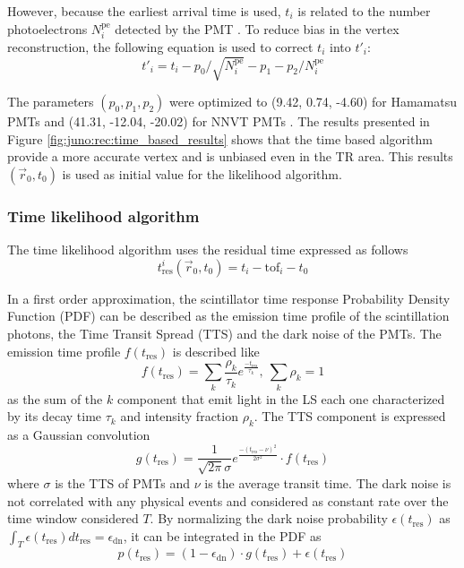 \documentclass[../main.tex]{subfiles}
\begin{document}
However, because the earliest arrival time is used, $t_i$ is related to the number photoelectrons $N_i^{\mathrm{pe}}$ detected by the PMT \cite{ranucci_analytical_1995, galbiati_time_2006, moszynski_status_1979}. To reduce bias in the vertex reconstruction, the following equation is used to correct $t_i$ into $t'_i$:
\begin{equation}
  t'_{i} = t_i - p_0 / \sqrt{N_i^{\mathrm{pe}}} - p_1 - p_2 / N_i^{\mathrm{pe}}
\end{equation}

The parameters $(p_0, p_1, p_2)$ were optimized to (9.42, 0.74, -4.60) for Hamamatsu PMTs and (41.31, -12.04, -20.02) for NNVT PMTs \cite{li_event_2021}. The results presented in Figure \ref{fig:juno:rec:time_based_results} shows that the time based algorithm provide a more accurate vertex and is unbiased even in the TR area. This results $(\vec{r}_0, t_0)$ is used as initial value for the likelihood algorithm.

\subsubsection{Time likelihood algorithm}

The time likelihood algorithm uses the residual time expressed as follows
\begin{equation}
  \label{eq:juno:rec:t_res}
  t_{\mathrm{res}}^i(\vec{r}_0, t_0) = t_i - \mathrm{tof}_i - t_0
\end{equation}

In a first order approximation, the scintillator time response Probability Density Function (PDF) can be described as the emission time profile of the scintillation photons, the Time Transit Spread (TTS) and the dark noise of the PMTs. The emission time profile $f(t_{\mathrm{res}})$ is described like
\begin{equation}
  f(t_{\mathrm{res}}) = \sum_k \frac{\rho_k}{\tau_k} e^{\frac{-t_{\mathrm{res}}}{\tau_k}}, ~ \sum_k \rho_k = 1
\end{equation}
as the sum of the $k$ component that emit light in the LS each one characterized by its decay time $\tau_k$ and intensity fraction $\rho_k$. The TTS component is expressed as a Gaussian convolution
\begin{equation}
  g(t_{\mathrm{res}}) = \frac{1}{\sqrt{2\pi}\sigma}e^{\frac{-(t_{\mathrm{res}} - \nu)^2}{2\sigma^2}} \cdot f(t_{\mathrm{res}})
\end{equation}
where $\sigma$ is the TTS of PMTs and $\nu$ is the average transit time. The dark noise is not correlated with any physical events and considered as constant rate over the time window considered $T$. By normalizing the dark noise probability $\epsilon(t_{\mathrm{res}})$ as $\int_T \epsilon(t_{\mathrm{res}}) dt_{\mathrm{res}} = \epsilon_{\mathrm{dn}}$, it can be integrated in the PDF as
\begin{equation}
  \label{eq:juno:juno:tim_like:dn}
  p(t_{\mathrm{res}}) = (1-\epsilon_{\mathrm{dn}}) \cdot g(t_{\mathrm{res}}) + \epsilon(t_{\mathrm{res}})
\end{equation}
\end{document}
